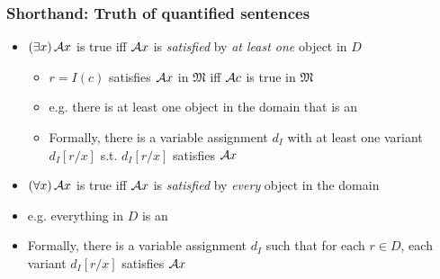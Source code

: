 \begin{frame}
  \frametitle{Shorthand: Truth of quantified sentences}

  \begin{itemize}[<+->]
    \item $(\exists x)\,\mathcal{A}x$ is true iff $\mathcal{A}x$ is \emph{satisfied} by \emph{at least one} object in $D$
    \begin{itemize}
\item $r = I(c)$ satisfies $\mathcal{A}x$ in $\mathfrak{M}$ iff $\mathcal{A}c$ is true in $\mathfrak{M}$ 

\item e.g. there is at least one object in the domain that is an 

\item Formally, there is a variable assignment $d_I$ with at least one variant $d_I [r/x]$ s.t. $d_I [r/x]$ satisfies $\mathcal{A}x$
    \end{itemize}

\bigskip

    \item $(\forall x)\,\mathcal{A}x$ is true iff $\mathcal{A}x$ is \emph{satisfied} by \emph{every} object in the domain
    \bi

\item e.g. everything in $D$ is an  
\item Formally, there is a variable assignment $d_I$ such that for each $r \in D$, each variant $d_I [r/x]$ satisfies $\mathcal{A}x$
\ei
  \end{itemize}
\end{frame}


